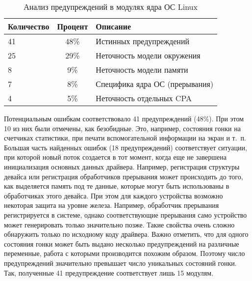 \begin{table}[h] \footnotesize \centering
    \caption{Анализ предупреждений в модулях ядра ОС Linux}
  	\label{table-unsafes}
    \begin{tabular}{ | l | c | l |}
      \hline
      Количество &	Процент    	& Описание \\ \hline
      41		&	48\%     	& Истинных предупреждений	\\ 
      25		&	29\%     	& Неточность модели окружения	\\ 
      8		    &	9\%     	& Неточность модели памяти	\\ 
      7		    &	8\%     	& Специфика ядра ОС (прерывания)  \\
      4		    &	5\%     	& Неточность отдельных CPA 	\\ 
      \hline
    \end{tabular}
  \end{table}

Потенциальным ошибкам соответствовало 41 предупреждений (48\%).
При этом 10 из них были отмечены, как безобидные. 
Это, например, состояния гонки на счетчиках статистики, при печати вспомогательной информации на экран и т.~п.
Большая часть найденных ошибок (18 предупреждений) соответствует ситуации, при которой новый поток создается в тот момент, когда еще не завершена инициализация основных данных драйвера.
Например, регистрация структуры девайса или регистрация обработчиков прерывания может происходить до того, как выделяется память под те данные, которые могут быть использованы в обработчиках этого девайса. 
При этом для каждого устройства возможно некоторая защита на уровне железа. 
Например, обработчик прерывания регистрируется в системе, однако соответствующие прерывания само устройство может генерировать только значительно позже.
Такие свойства очень сложно обнаружить только по исходному коду драйвера.
Важно отметить, что для одного состояния гонки может быть выдано несколько предупреждений на различные переменные, работа с которыми производится похожим образом.
Поэтому число предупреждений значительно превышает число уникальных состояний гонки.
Так, полученные 41 предупреждение соответствует лишь 15 модулям.

